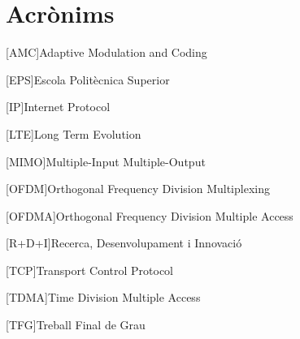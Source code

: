 \chapter{Acrònims} %
%
%
\begin{acronym}

[AMC]{Adaptive Modulation and Coding}

[EPS]{Escola Politècnica Superior}

[IP]{Internet Protocol}

[LTE]{Long Term Evolution}

[MIMO]{Multiple-Input Multiple-Output}

[OFDM]{Orthogonal Frequency Division Multiplexing}

[OFDMA]{Orthogonal Frequency Division Multiple Access}

[R+D+I]{Recerca, Desenvolupament i Innovació}

[TCP]{Transport Control Protocol}

[TDMA]{Time Division Multiple Access}

[TFG]{Treball Final de Grau}


\end{acronym}
